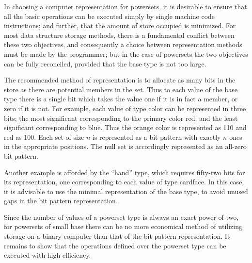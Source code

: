 \documentclass[twoside,11pt]{book}
\begin{document}
In choosing a computer representation for powersets, it is desirable to ensure that all the basic operations can be executed simply by single machine code instructions; and further, that the amount of store occupied is minimized. For most data structure storage methods, there is a fundamental conflict between these two objectives, and consequently a choice between representation methods must be made by the programmer; but in the case of powersets the two objectives can be fully reconciled, provided that the base type is not too large.

The recommended method of representation is to allocate as many bits in the store as there are potential members in the set. Thus to each value of the base type there is a single bit which takes the value one if it is in fact a member, or zero if it is not. For example, each value of type color can be represented in three bits; the most significant corresponding to the primary color red, and the least significant corresponding to blue. Thus the orange color is represented as 110 and red as 100. Each set of size $n$ is represented as a bit pattern with exactly $n$ ones in the appropriate positions. The null set is accordingly represented as an all-zero bit pattern.

Another example is afforded by the ``hand'' type, which requires fifty-two bits for its representation, one corresponding to each value of type cardface. In this case, it is advisable to use the minimal representation of the base type, to avoid unused gaps in the bit pattern representation.

Since the number of values of a powerset type is always an exact power of two, for powersets of small base there can be no more economical method of utilizing storage on a binary computer than that of the bit pattern representation. It remains to show that the operations defined over the powerset type can be executed with high efficiency.
\end{document}
